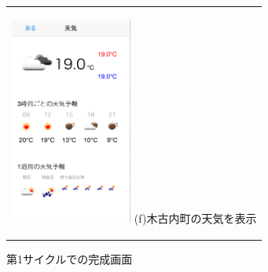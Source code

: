 \begin{figure}[htbp]
\begin{center}
\begin{tabular}{c}
      \begin{minipage}{0.33\hsize}
        \begin{center}
\includegraphics[width=4cm, bb=0 0 320 549]{5.3_weather.png}
          \hspace{1cm} (f)木古内町の天気を表示
        \end{center}
      \end{minipage}

    \end{tabular}
    \caption{第1サイクルでの完成画面 }
    
    \label{fig:lena}
  \end{center}
\end{figure}

